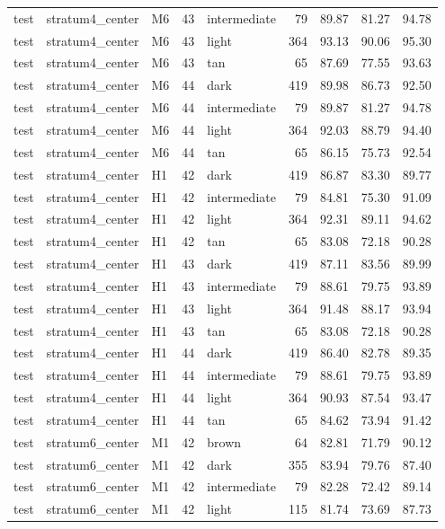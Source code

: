 \begin{tabular}{lllrlrrrr}
test & stratum4\_center & M6 & 43 & intermediate & 79 & 89.87 & 81.27 & 94.78 \\
test & stratum4\_center & M6 & 43 & light & 364 & 93.13 & 90.06 & 95.30 \\
test & stratum4\_center & M6 & 43 & tan & 65 & 87.69 & 77.55 & 93.63 \\
test & stratum4\_center & M6 & 44 & dark & 419 & 89.98 & 86.73 & 92.50 \\
test & stratum4\_center & M6 & 44 & intermediate & 79 & 89.87 & 81.27 & 94.78 \\
test & stratum4\_center & M6 & 44 & light & 364 & 92.03 & 88.79 & 94.40 \\
test & stratum4\_center & M6 & 44 & tan & 65 & 86.15 & 75.73 & 92.54 \\
test & stratum4\_center & H1 & 42 & dark & 419 & 86.87 & 83.30 & 89.77 \\
test & stratum4\_center & H1 & 42 & intermediate & 79 & 84.81 & 75.30 & 91.09 \\
test & stratum4\_center & H1 & 42 & light & 364 & 92.31 & 89.11 & 94.62 \\
test & stratum4\_center & H1 & 42 & tan & 65 & 83.08 & 72.18 & 90.28 \\
test & stratum4\_center & H1 & 43 & dark & 419 & 87.11 & 83.56 & 89.99 \\
test & stratum4\_center & H1 & 43 & intermediate & 79 & 88.61 & 79.75 & 93.89 \\
test & stratum4\_center & H1 & 43 & light & 364 & 91.48 & 88.17 & 93.94 \\
test & stratum4\_center & H1 & 43 & tan & 65 & 83.08 & 72.18 & 90.28 \\
test & stratum4\_center & H1 & 44 & dark & 419 & 86.40 & 82.78 & 89.35 \\
test & stratum4\_center & H1 & 44 & intermediate & 79 & 88.61 & 79.75 & 93.89 \\
test & stratum4\_center & H1 & 44 & light & 364 & 90.93 & 87.54 & 93.47 \\
test & stratum4\_center & H1 & 44 & tan & 65 & 84.62 & 73.94 & 91.42 \\
test & stratum6\_center & M1 & 42 & brown & 64 & 82.81 & 71.79 & 90.12 \\
test & stratum6\_center & M1 & 42 & dark & 355 & 83.94 & 79.76 & 87.40 \\
test & stratum6\_center & M1 & 42 & intermediate & 79 & 82.28 & 72.42 & 89.14 \\
test & stratum6\_center & M1 & 42 & light & 115 & 81.74 & 73.69 & 87.73 \\

\end{tabular}
